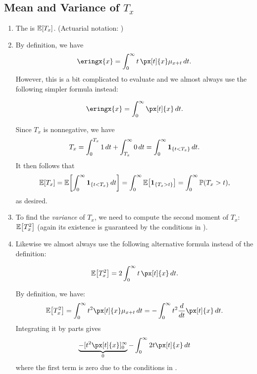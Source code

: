 \subsection{Mean and Variance of \(T_x\)}
\begin{enumerate}
\item The  is \(\mathbb{E}\qty[T_x]\). (Actuarial
notation: )


\item By definition, we have
\[
\eringx{x}=\int_{0}^{\infty}t\,\px[t]{x}\mu_{x+t}\,dt.
\]
However, this is a bit complicated to evaluate and we almost always use the
following simpler formula instead:
\begin{proposition}
\label{prp:eringx-fmla}
\[
\eringx{x}=\int_0^{\infty}\px[t]{x}\,dt.
\]
\end{proposition}

\begin{pf}
Since \(T_x\) is nonnegative, we have
\[
T_x=\int_{0}^{T_x}1\,dt+\int_{T_x}^{\infty}0\,dt
=\int_{0}^{\infty}\mathbf{1}_{\left\{t<T_x\right\}}\,dt.
\]
It then follows that
\[
\mathbb{E}\qty[T_x]=\mathbb{E}\qty[\int_{0}^{\infty}\mathbf{1}_{\left\{t<T_x\right\}}\,dt]
=\int_{0}^{\infty}\mathbb{E}\qty[\mathbf{1}_{\left\{T_x>t\right\}}]
=\int_{0}^{\infty}\mathbb{P}\qty(T_x>t),
\]
as desired.
\end{pf}

\item To find the \emph{variance} of \(T_x\), we need to compute the second
moment of \(T_x\): \(\mathbb{E}\qty[T_x^2]\) (again its existence is guaranteed by the
conditions in ).
\item Likewise we almost always use the following alternative formula instead
of the definition:
\begin{proposition}
\[
\expv{T_x^2}=2\int_{0}^{\infty}t\,\px[t]{x}\,dt.
\]
\end{proposition}
\begin{pf}
By definition, we have:
\[
\expv{T_x^2}=\int_{0}^{\infty}t^2\px[t]{x}\mu_{x+t}\,dt
=-\int_{0}^{\infty}t^2\frac{d}{dt}\px[t]{x}\,dt.
\]
Integrating it by parts gives
\[
\underbrace{-[t^2\px[t]{x}]_0^{\infty}}_{0}-\int_{0}^{\infty}2t\px[t]{x}\,dt
\]
where the first term is zero due to the conditions in
.
\end{pf}


\end{enumerate}
